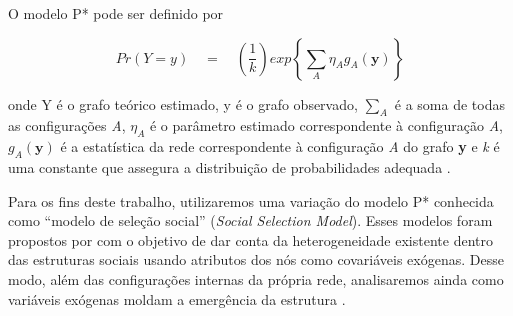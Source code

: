 \documentclass[a4paper, 12pt, openright, oneside, german, french, english, brazil]{abntex2}
\begin{document}
	O modelo P* pode ser definido por




	$$Pr(Y=y) \quad = \quad \left(\frac{1}{k}\right) exp \left\{ \sum_{A} \eta_A g_A (\textbf{y}) \right\}$$




	onde Y é o grafo teórico estimado, y é o grafo observado, $\sum_{A}$ é a soma de todas as configurações \textit{A},  $\eta_A$ é o parâmetro estimado correspondente à configuração \textit{A}, $g_A(\textbf{y})$ é a estatística da rede correspondente à configuração \textit{A} do grafo \textbf{y} e \textit{k} é uma constante que assegura a distribuição de probabilidades adequada \cite{robins2007introduction}.



	Para os fins deste trabalho, utilizaremos uma variação do modelo P* conhecida como ``modelo de seleção social'' (\textit{Social Selection Model}). Esses modelos foram propostos por  com o objetivo de dar conta da heterogeneidade existente dentro das estruturas sociais usando atributos dos nós como covariáveis exógenas. Desse modo, além das configurações internas da própria rede, analisaremos ainda como variáveis exógenas moldam a emergência da estrutura \cite{wang2016social}.












\end{document}
